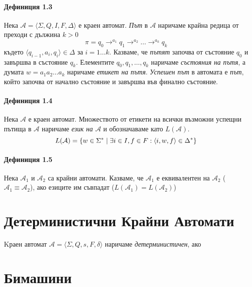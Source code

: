 \documentclass[11pt, oneside]{article}   	%
\begin{document}
\paragraph{Дефиниция 1.3} Нека \( \mathcal{A} = \langle \Sigma, Q, I, F, \Delta \rangle \) е краен автомат. \emph{Път} в \( \mathcal{A} \) наричаме крайна редица от преходи с дължина \( k > 0 \) \[ \pi = q_0 \to^{a_1} q_1 \to^{a_2} \ldots \to^{a_k} q_k \] където \( \langle q_{i-1}, a_i, q_i \rangle \in \Delta \) за \( i = 1 \ldots k \). Казваме, че \emph{пътят} започва от състояние \( q_0 \) и завършва в състояние \( q_k \). Елементите \( q_0,q_1, \ldots ,q_k \) наричаме \emph{състояния на пътя}, а думата \( w = a_1 a_2 \ldots a_k \) наричаме \emph{етикет на пътя}. \newline \emph{Успешен път} в автомата е \emph{път}, който започва от начално състояние и завършва във финално състояние.

\paragraph{Дефиниция 1.4} Нека \( \mathcal{A} \) е краен автомат. Множеството от етикети на всички възможни успещни пътища в \( \mathcal{A} \) наричаме \emph{език на \( \mathcal{A} \)} и обозначаваме като \( L(\mathcal{A}) \). \[ L(\mathcal{A}) = \{ w \in \Sigma^* \hspace{0.1cm} | \hspace{0.1cm} \exists i \in I, f \in F : \langle i, w, f \rangle \in \Delta^* \} \]

\paragraph{Дефиниция 1.5} Нека \( \mathcal{A}_1 \) и \( \mathcal{A}_2 \) са крайни автомати. Казваме, че \( \mathcal{A}_1 \) е еквивалентен на \( \mathcal{A}_2 \) (\( \mathcal{A}_1 \equiv \mathcal{A}_2 \)), ако езиците им съвпадат (\( L(\mathcal{A}_1) = L(\mathcal{A}_2) \))

\section{Детерминистични Крайни Автомати}

Kраен автомат \( \mathcal{A} = \langle \Sigma, Q, s, F, \delta \rangle \) наричаме \emph{детерминистичен}, ако 

\section{Бимашини}
\end{document}
